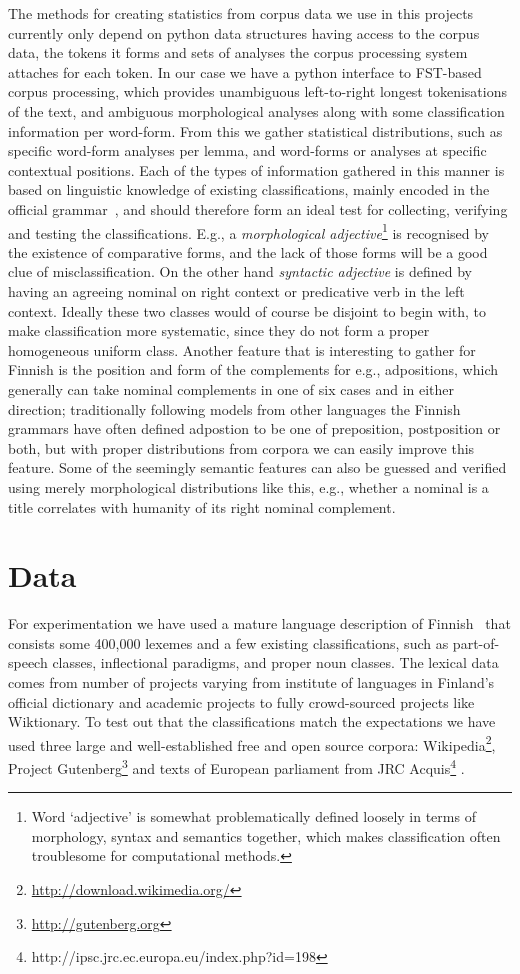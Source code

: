 \documentclass[a5paper]{article}
\begin{document}
The methods for creating statistics from corpus data we use in this projects
currently only depend on python data structures having access to the corpus
data, the tokens it forms and sets of analyses the corpus processing system
attaches for each token. In our case we have a python interface to FST-based
corpus processing, which provides unambiguous left-to-right longest
tokenisations of the text, and ambiguous morphological analyses along with some
classification information per word-form. From this we gather statistical
distributions, such as specific word-form analyses per lemma, and word-forms or
analyses at specific contextual positions. Each of the types of information
gathered in this manner is based on linguistic knowledge of existing
classifications, mainly encoded in the official grammar~\cite{visk}, and should
therefore form an ideal test for collecting, verifying and testing the
classifications. E.g., a \emph{morphological adjective}\footnote{Word
`adjective' is somewhat problematically defined loosely in terms of morphology,
syntax and semantics together, which makes classification often troublesome for
computational methods.} is recognised by the existence of comparative forms,
and the lack of those forms will be a good clue of misclassification. On the
other hand \emph{syntactic adjective} is defined by having an agreeing nominal
on right context or predicative verb in the left context. Ideally these two
classes would of course be disjoint to begin with, to make classification more
systematic, since they do not form a proper homogeneous uniform class.  Another
feature that is interesting to gather for Finnish is the position and form of
the complements for e.g., adpositions, which generally can take nominal
complements in one of six cases and in either direction; traditionally following
models from other languages the Finnish grammars have often defined adpostion
to be one of preposition, postposition or both, but with proper distributions
from corpora we can easily improve this feature. Some of the seemingly semantic
features can also be guessed and verified using merely morphological
distributions like this, e.g., whether a nominal is a title correlates
with humanity of its right nominal complement.

\section{Data}

For experimentation we have used a mature language description of
Finnish~\cite{pirinen2011modularisation} that consists some 400,000 lexemes and
a few existing classifications, such as part-of-speech classes, inflectional
paradigms, and proper noun classes. The lexical data comes from number of
projects varying from institute of languages in Finland's official dictionary
and academic projects to fully crowd-sourced projects like Wiktionary. To test
out that the classifications match the expectations we have used three large
and well-established free and open source corpora:
Wikipedia\footnote{\url{http://download.wikimedia.org/}}, Project
Gutenberg\footnote{\url{http://gutenberg.org}} and texts of European
parliament from JRC
Acquis\footnote{http://ipsc.jrc.ec.europa.eu/index.php?id=198}
\cite{steinberger2006jrc}. 
\end{document}

